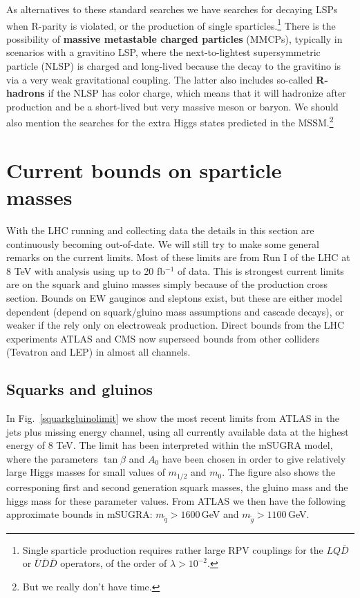 \documentclass[notes.tex]{subfiles}
\begin{document}
As alternatives to these standard searches we have searches for decaying LSPs when R-parity is violated, or the production of single sparticles.\footnote{Single sparticle production requires rather large RPV couplings for the $LQ\bar D$ or $\bar U \bar D\bar D$ operators, of the order of $\lambda > 10^{-2}$.} There is the possibility of {\bf massive metastable charged particles} (MMCPs), typically in scenarios with a gravitino LSP, where the next-to-lightest supersymmetric particle (NLSP) is charged and long-lived because the decay to the gravitino is via a very weak gravitational coupling. The latter also includes so-called {\bf R-hadrons} if the NLSP has color charge, which means that it will hadronize after production and be a short-lived but very massive meson or baryon. We should also mention the searches for the extra Higgs states predicted in the MSSM.\footnote{But we really don't have time.}


\section{Current bounds on sparticle masses}
With the LHC running and collecting data the details in this section are continuously becoming out-of-date. We will still try to make some general remarks on the current limits. Most of these limits are from Run I of the LHC at 8 TeV with analysis using up to 20 fb$^{-1}$ of data. This is strongest current limits are on the squark and gluino masses simply because of the production cross section. Bounds on EW gauginos and sleptons exist, but these are either model dependent (depend on squark/gluino mass assumptions and cascade decays), or weaker if the rely only on electroweak production. Direct bounds from the LHC experiments ATLAS and CMS now superseed  bounds from other colliders (Tevatron and LEP) in almost all channels.

\subsection{Squarks and gluinos}
In Fig.~\ref{squarkgluinolimit} we show the most recent limits from ATLAS in the jets plus missing energy channel, using all currently available data at the highest energy of 8 TeV. The limit has been interpreted within the mSUGRA model, where the parameters $\tan\beta$ and $A_0$ have been chosen in order to give relatively large Higgs masses for small values of $m_{1/2}$ and $m_0$. The figure also shows the corresponing first and second generation squark masses, the gluino mass and the higgs mass for these parameter values. From ATLAS we then have the following approximate bounds in mSUGRA: $m_{\tilde{q}}>1600$\,GeV and $m_{\tilde{g}}> 1100$\,GeV.
\end{document}
